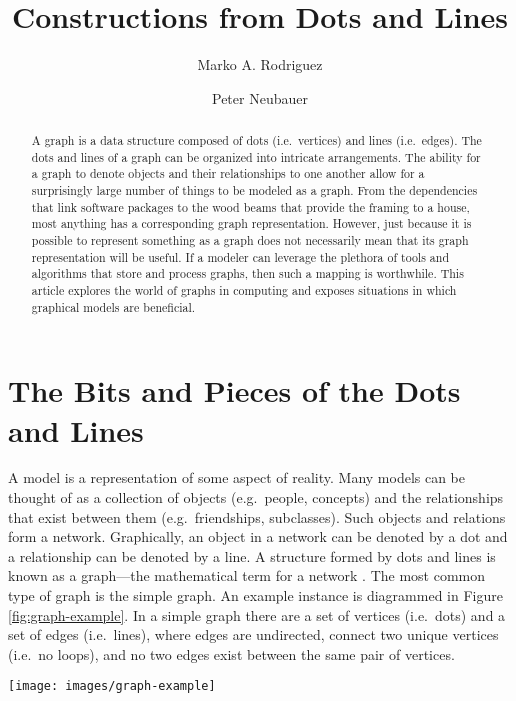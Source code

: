 \documentclass{svmult}
\begin{document}
\title*{Constructions from Dots and Lines}
\author{Marko A. Rodriguez \and Peter Neubauer}


\maketitle


\begin{abstract}
A graph is a data structure composed of dots (i.e.~vertices) and lines (i.e.~edges). The dots and lines of a graph can be organized into intricate arrangements. The ability for a graph to denote objects and their relationships to one another allow for a surprisingly large number of things to be modeled as a graph. From the dependencies that link software packages to the wood beams that provide the framing to a house, most anything has a corresponding graph representation. However, just because it is possible to represent something as a graph does not necessarily mean that its graph representation will be useful. If a modeler can leverage the plethora of tools and algorithms that store and process graphs, then such a mapping is worthwhile. This article explores the world of graphs in computing and exposes situations in which graphical models are beneficial.
\end{abstract}

\section{The Bits and Pieces of the Dots and Lines}

A model is a representation of some aspect of reality. Many models can be thought of as a collection of objects (e.g.~people, concepts) and the relationships that exist between them (e.g.~friendships, subclasses). Such objects and relations form a network. Graphically, an object in a network can be denoted by a dot and a relationship can be denoted by a line. A structure formed by dots and lines is known as a graph---the mathematical term for a network \cite{intrograph:trudeau1976}. The most common type of graph is the simple graph. An example instance is diagrammed in Figure \ref{fig:graph-example}. In a simple graph there are a set of vertices (i.e.~dots) and a set of edges (i.e.~lines), where edges are undirected, connect two unique vertices (i.e.~no loops), and no two edges exist between the same pair of vertices.
\begin{figure*}[h!]
	\centering
		\texttt{[image: images/graph-example]}
	\caption{\label{fig:graph-example}The prototypical graph is the simple graph. In this structure there exists dots (i.e.~vertices) and lines (i.e.~edges). While the primitives are simple, their amalgamation can yield great complexity.}
\end{figure*}
\end{document}
